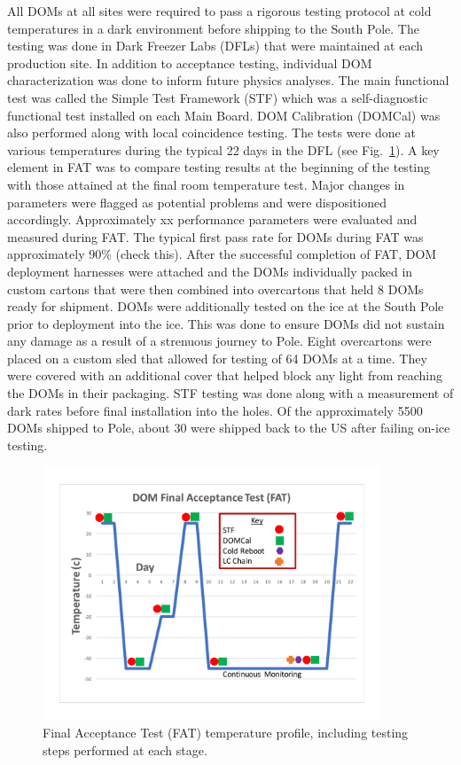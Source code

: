 All DOMs at all sites were required to pass a rigorous testing protocol at
cold temperatures in a dark environment before shipping to the South
Pole. The testing was done in Dark Freezer Labs (DFLs) that were maintained
at each production site. In addition to acceptance testing, individual DOM
characterization was done to inform future physics analyses. The main
functional test was called the Simple Test Framework (STF) which was a
self-diagnostic functional test installed on each Main Board. DOM
Calibration (DOMCal) was also performed along with local coincidence
testing. The tests were done at various temperatures during the typical 22
days in the DFL (see Fig.~\ref{fig:fat_cycle}). A key element in FAT was to compare testing
results at the beginning of the testing with those attained at the final
room temperature test. Major changes in parameters were flagged as
potential problems and were dispositioned accordingly. Approximately xx
performance parameters were evaluated and measured during FAT. The typical
first pass rate for DOMs during FAT was approximately 90\% (check
this). After the successful completion of FAT, DOM deployment harnesses
were attached and the DOMs individually packed in custom cartons that were
then combined into overcartons that held 8 DOMs ready for shipment. DOMs
were additionally tested on the ice at the South Pole prior to deployment
into the ice. This was done to ensure DOMs did not sustain any damage as a
result of a strenuous journey to Pole. Eight overcartons were placed on a
custom sled that allowed for testing of 64 DOMs at a time. They were
covered with an additional cover that helped block any light from reaching
the DOMs in their packaging. STF testing was done along with a measurement
of dark rates before final installation into the holes. Of the
approximately 5500 DOMs shipped to Pole, about 30 were shipped back to the
US after failing on-ice testing.    

\begin{figure}[!h]
 \centering
 \includegraphics[width=0.9\textwidth]{graphics/dom/production/fat_cycle.pdf}
 \caption{Final Acceptance Test (FAT) temperature profile, including
   testing steps performed at each stage.}
 \label{fig:fat_cycle}
\end{figure}

